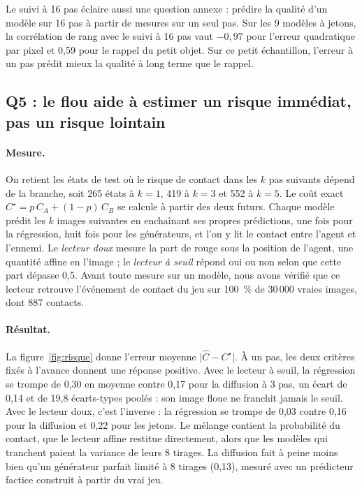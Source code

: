 \documentclass[a4paper, 11pt]{article}
\begin{document}
Le suivi à 16 pas éclaire aussi une question annexe : prédire la qualité d'un modèle sur 16 pas à partir de mesures sur un
seul pas. Sur les 9 modèles à jetons, la corrélation de rang avec le suivi à 16 pas vaut $-0{,}97$ pour l'erreur quadratique
par pixel et 0,59 pour le rappel du petit objet. Sur ce petit échantillon, l'erreur à un pas prédit mieux la qualité à long terme que le rappel.

\subsection{Q5 : le flou aide à estimer un risque immédiat, pas un risque lointain}

\paragraph{Mesure.} On retient les états de test où le risque de contact dans les $k$ pas suivants dépend de la branche, soit
265 états à $k = 1$, 419 à $k = 3$ et 552 à $k = 5$. Le coût exact $C^\star = p\,C_A + (1-p)\,C_B$ se calcule à partir des
deux futurs. Chaque modèle prédit les $k$ images suivantes en enchaînant ses propres prédictions, une fois pour la régression,
huit fois pour les générateurs, et l'on y lit le contact entre l'agent et l'ennemi. Le \emph{lecteur doux} mesure la part de
rouge sous la position de l'agent, une quantité affine en l'image ; le \emph{lecteur à seuil} répond oui ou non selon que
cette part dépasse 0,5. Avant toute mesure sur un modèle, nous avons vérifié que ce lecteur retrouve l'événement de contact
du jeu sur 100~\% de 30\,000 vraies images, dont 887 contacts.

\paragraph{Résultat.} La figure~\ref{fig:risque} donne l'erreur moyenne $\lvert \hat C - C^\star\rvert$. À un pas, les deux
critères fixés à l'avance donnent une réponse positive. Avec le lecteur à seuil, la régression se trompe de 0,30 en moyenne
contre 0,17 pour la diffusion à 3 pas, un écart de 0,14 et de 19,8 écarts-types poolés : son image floue ne franchit jamais
le seuil. Avec le lecteur doux, c'est l'inverse : la régression se trompe de 0,03 contre 0,16 pour la diffusion et 0,22 pour
les jetons. Le mélange contient la probabilité du contact, que le lecteur affine restitue directement, alors que les modèles
qui tranchent paient la variance de leurs 8 tirages. La diffusion fait à peine moins bien qu'un générateur parfait limité à
8 tirages (0,13), mesuré avec un prédicteur factice construit à partir du vrai jeu.
\end{document}
